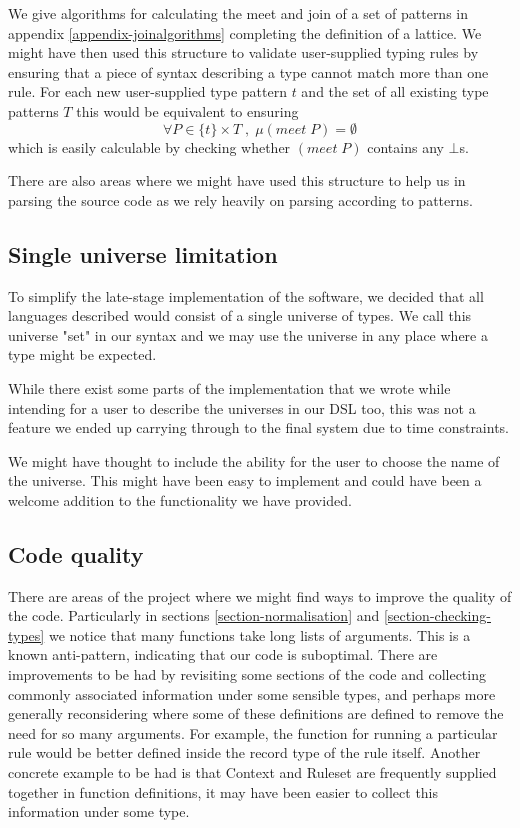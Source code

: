 We give algorithms for calculating the meet and join of a set of
patterns in appendix \ref{appendix-joinalgorithms} completing the
definition of a lattice. We might have then used this structure to
validate user-supplied typing rules by ensuring that a piece of syntax
describing a type cannot match more than one rule. For each new
user-supplied type pattern $t$ and the set of all existing type patterns $T$
this would be equivalent to ensuring
$$
\forall P \in \{t\} × T \;,\; \mu (meet \; P) = \emptyset
$$
which is easily calculable by checking whether $(meet \; P)$ contains
any $\bot$s.

There are also areas where we might have used this structure to help
us in parsing the source code as we rely heavily on parsing according
to patterns.
\subsection{Single universe limitation}
To simplify the late-stage implementation of the
software, we decided that all languages described would consist of a
single universe of types. We call this universe "set" in our syntax
and we may use the universe in any place where a type might be
expected.

While there exist some parts of the implementation that we wrote
while intending for a user to describe the universes in our DSL too,
this was not a feature we ended up carrying through to the final
system due to time constraints.

We might have thought to include the ability for the user to
choose the name of the universe. This might have been easy to
implement and could have been a welcome addition to the functionality
we have provided.
\subsection{Code quality}
There are areas of the project where we might find ways to
improve the quality of the code. Particularly in sections
\ref{section-normalisation} and \ref{section-checking-types} we notice
that many functions take long lists of arguments. This is a known
anti-pattern, indicating that our code is suboptimal. There are improvements to be
had by revisiting some sections of the code and collecting commonly
associated information under some sensible types, and perhaps more
generally reconsidering where some of these definitions are defined
to remove the need for so many arguments. For example, the function
for running a particular rule would be better defined inside the
record type of the rule itself. Another concrete example to be had is
that Context and Ruleset are frequently supplied together in
function definitions, it may have been easier to collect this
information under some type.

